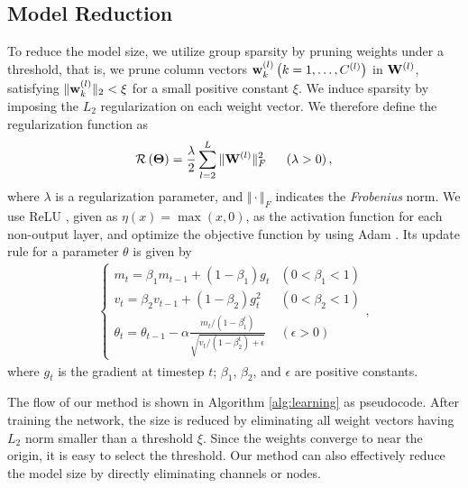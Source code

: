 \documentclass[conference]{IEEEtran}
\begin{document}
\subsection{Model Reduction}\label{subsec:model_reduction}
To reduce the model size, we utilize group sparsity by pruning weights under a threshold, that is, we prune column vectors ${\bf w}_k^{\left ( l \right )} \left ( k = 1,\dots,C^{\left ( l\right )} \right )$ in ${\bf W}^{\left ( l \right)}$, satisfying $ \Vert {\bf w}_k^{\left ( l \right )} \Vert _2 < \xi$ for a small positive constant $\xi$.
We induce sparsity by imposing the $L_2$ regularization on each weight vector. We therefore define the regularization function as
\begin{align}{\mathcal R} \left( {\bf \Theta} \right ) = \frac{\lambda}{2} \sum_{l=2}^L \Vert {\bf W}^{\left( l \right)} \Vert_F^2 \hspace{5mm} \left( \lambda > 0 \right ),
\end{align}
where $\lambda$ is a regularization parameter, and $\Vert {\cdot} \Vert_F$ indicates the \textit{Frobenius} norm.
We use ReLU \cite{Glorot_2011}, given as $\eta(x) = \max(x, 0)$, as the activation function for each non-output layer, and optimize the objective function by using Adam \cite{Kingma_2015}. 
Its update rule for a parameter $\theta$ is given by
\begin{align}\label{eq:adam}
	\left \{
		\begin{array}{ll}
		m_t = \beta_1 m_{t-1} + \left( 1 - \beta_1 \right)g_t																				&	\left( 0 < \beta_1 < 1 \right ) \\
		v_t = \beta_2 v_{t-1} + \left( 1 - \beta_2 \right)g_t^2																				&	\left( 0 < \beta_2 < 1 \right ) \\
		\theta_t = \theta_{t-1} - \alpha \frac{m_t / \left( 1 - \beta_1^t \right )}{\sqrt{v_t / \left( 1 - \beta_2^t \right) + \epsilon} }	&	\left( \epsilon > 0 \right )
		\end{array},
	\right.
\end{align}
where $g_t$ is the gradient at timestep $t$; $\beta_1$, $\beta_2$, and $\epsilon$ are positive constants.

The flow of our method is shown in Algorithm \ref{alg:learning} as pseudocode.
After training the network, the size is reduced by eliminating all weight vectors having $L_2$ norm smaller than a threshold $\xi$.
Since the weights converge to near the origin, it is easy to select the threshold. 
Our method can also effectively reduce the model size by directly eliminating channels or nodes.
\end{document}
